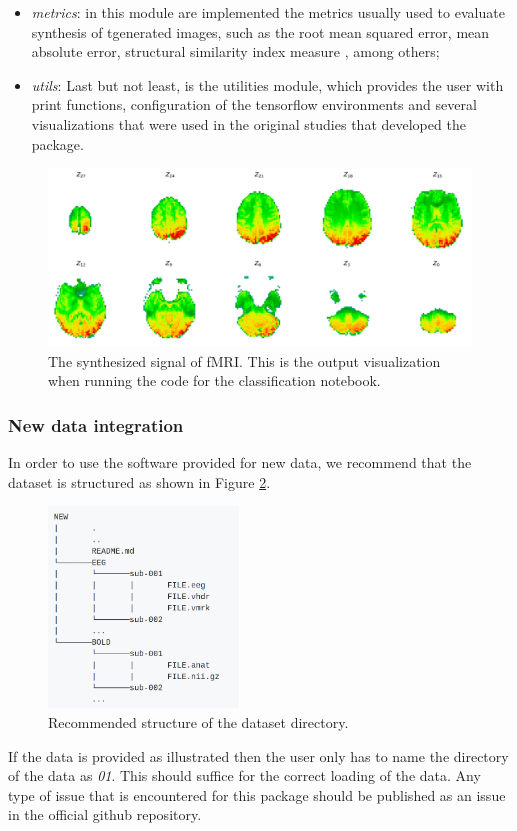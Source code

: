 \begin{itemize}
    \item \textit{metrics}: in this module are implemented the metrics usually used to evaluate synthesis of tgenerated images, such as the root mean squared error, mean absolute error, structural similarity index measure \cite{wang2004image}, among others; 
    \item \textit{utils}: Last but not least, is the utilities module, which provides the user with print functions, configuration of the tensorflow environments and several visualizations that were used in the original studies that developed the package.
\end{itemize}

\begin{figure}[t]
    \centering
    \includegraphics[width=\textwidth]{figures/sythesized.png}
    \caption{The synthesized signal of fMRI. This is the output visualization when running the code for the classification notebook.}
    \label{fig:synthesized}
\end{figure}

\subsubsection{New data integration}\label{section:new_data}

In order to use the software provided for new data, we recommend that the dataset is structured as shown in Figure \ref{fig:structure}.
\begin{figure}[ht]
    \centering
    \includegraphics[width=0.45\textwidth]{figures/structure.png}
    \caption{Recommended structure of the dataset directory.}
    \label{fig:structure}
\end{figure}
If the data is provided as illustrated then the user only has to name the directory of the data as \textit{01}. This should suffice for the correct loading of the data. Any type of issue that is encountered for this package should be published as an issue in the official github repository.

